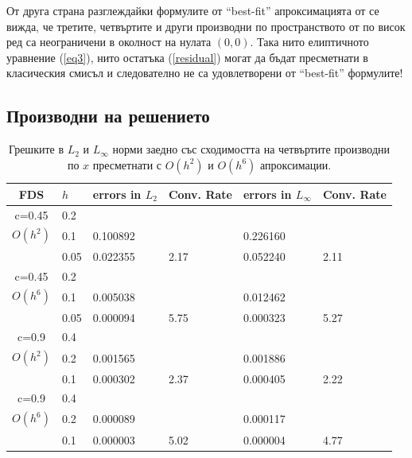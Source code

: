 \documentclass{article}
\newcommand{\rf}[1]{(\ref{#1})}
\begin{document}
От друга страна разглеждайки формулите от ``best-fit'' апроксимацията от \cite{Ch2011} се вижда, че третите, четвъртите и други производни по пространството от по висок ред са неограничени в околност на нулата $(0,0)$. Така нито елиптичното уравнение \rf{eq3}, нито остатъка \rf{residual} могат да бъдат пресметнати в класическия смисъл и следователно не са удовлетворени от ``best-fit'' формулите!

\subsection{Производни на решението}
\begin{center}
\begin{table}[ht]
\centering
		\begin{tabular}{||c|l|ll|ll||}
			\hline
			\hline
      FDS       & $h$ &errors in $L_2$&Conv. Rate& errors in $L_\infty$&Conv. Rate\\
   			\hline 
					\hline 
      c=0.45    	& 0.2  	&             		&             &                    &   \\
   $O(h^2)$     	& 0.1    	& 0.100892  	&             	& 0.226160 &   \\
                		& 0.05   & 0.022355  	& 2.17  		& 0.052240 &2.11 \\
               	 \hline 
      c=0.45    	& 0.2  	&             		&             &                    &   \\
   $O(h^6)$     	& 0.1    	& 0.005038  	&             &  0.012462 &   \\
                		& 0.05   & 0.000094  	& 5.75 	  &  0.000323 &5.27 \\
			\hline
			\hline 	
      c=0.9     	& 0.4  	&             		&             &                    &   \\
   $O(h^2)$     	& 0.2    	& 0.001565  	&             	&0.001886 &   \\
                		& 0.1    & 0.000302  	& 2.37  		&0.000405 &2.22 \\
               	 \hline 
      c=0.9     	& 0.4  	&             		&             &                    &   \\
   $O(h^6)$     	& 0.2    	& 0.000089  	&             & 0.000117 &   \\
                		& 0.1    & 0.000003  	& 5.02 	  & 0.000004  &4.77 \\
		   \hline
			\hline 
		\end{tabular}
		\caption{Грешките в $L_2$ и $L_\infty$ норми заедно със сходимостта на четвъртите производни по $x$ пресметнати с $O(h^2)$ и $O(h^6)$ апроксимации.}
\label{tab:fourth-der}
\end{table}
\end{center}
\end{document}
